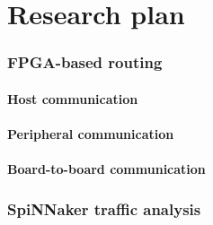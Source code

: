 \chapter{Research plan}
	
	
	\subsection{FPGA-based routing}
		
		
		\subsubsection{Host communication}
			
		
		\subsubsection{Peripheral communication}
			
		
		\subsubsection{Board-to-board communication}
			
	
	
	\subsection{SpiNNaker traffic analysis}
		
	
